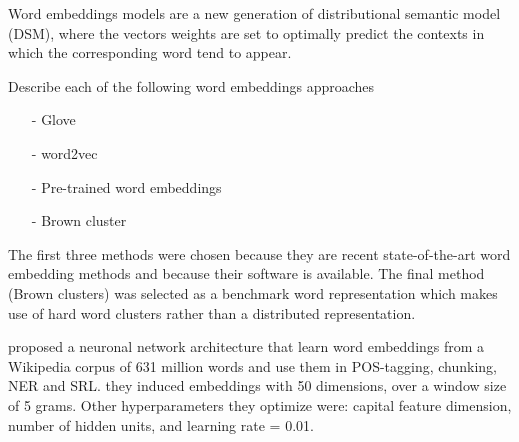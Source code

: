 \documentclass[11pt]{article}
\begin{document}
Word embeddings models are a new generation of distributional semantic
model (DSM), where the vectors weights are set to optimally predict the
contexts in which the corresponding word tend to appear.

{\color{blue}Describe each of the following word embeddings approaches}
\begin{itemize}
\item[-] Glove \cite{pennington2014glove}
\item[-] word2vec \cite{Mikolov13}
\item[-] Pre-trained word embeddings \cite{Turian10wordrepresentations}
\item[-] Brown cluster \cite{Brown92class-basedn-gram}
\end{itemize}

The first three methods were chosen because they are recent
state-of-the-art word embedding methods and because their software is
available. The final method (Brown clusters) was selected as a benchmark
word representation which makes use of hard word clusters rather than
a distributed representation.

  

 proposed a neuronal network architecture
that learn word embeddings from a Wikipedia corpus of 631 million words
and use them in POS-tagging, chunking, NER and SRL.
they induced embeddings with 50 dimensions, over a window size of 5 grams.
Other hyperparameters they optimize were: capital feature dimension, number of hidden units, and learning rate = 0.01. 
\end{document}
